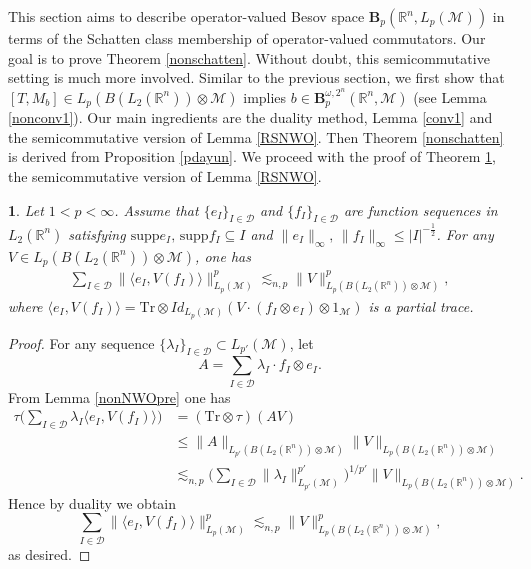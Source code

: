 \documentclass[oneside,english,a4wide]{amsart}
\numberwithin{equation}{section}
\numberwithin{figure}{section}
\theoremstyle{plain}
\newtheorem{thm}{\protect\theoremname}[section]
\theoremstyle{plain}
\theoremstyle{definition}
\theoremstyle{plain}
\theoremstyle{remark}
\theoremstyle{definition}
\theoremstyle{remark}
\theoremstyle{definition}
\providecommand{\theoremname}{Theorem}
\newcommand{\M}{{\mathcal M}}
\newcommand{\8}{\infty}
\begin{document}
This section aims to describe operator-valued Besov space  $\pmb{B}_p(\mathbb{R}^n, L_p(\mathcal{M}))$ in terms of the Schatten class membership of operator-valued commutators. Our goal is to prove Theorem \ref{nonschatten}. Without doubt, this semicommutative setting is much more involved. Similar to the previous section, we first show that $[T,M_b]\in L_p(B(L_2(\mathbb{R}^n))\otimes \mathcal{M})$ implies $b\in \pmb{B}_p^{\omega,2^n}(\mathbb{R}^n,\mathcal{M})$ (see Lemma \ref{nonconv1}). Our main ingredients are the duality method, Lemma \ref{conv1} and the semicommutative version of Lemma \ref{RSNWO}. Then Theorem \ref{nonschatten} is derived from Proposition \ref{pdayun}. We proceed with the proof of Theorem \ref{nonRSNWO}, the semicommutative version of Lemma \ref{RSNWO}.
\begin{thm}\label{nonRSNWO}
	Let $1<p<\infty$. Assume that $\{e_I\}_{I\in\mathcal{D}}$ and $\{f_I\}_{I\in\mathcal{D}}$ are function sequences in $L_2(\mathbb{R}^n)$ satisfying $\mathrm{supp}e_I, \,\mathrm{supp}f_I\subseteq I$ and
	$\|e_I\|_{\infty},\,\|f_I\|_{\infty}\le |I|^{-\frac{1}{2}}$.  For any $V\in L_p(B(L_2(\mathbb{R}^n))\otimes \mathcal{M})$, one has
	\begin{equation*}
		\begin{aligned}
			\sum_{I\in\mathcal{D}}\big\|\langle e_I,V(f_I)\rangle\big\|^p_{L_p(\mathcal{M})}\lesssim_{n,p} \|V\|^p_{L_p(B(L_2(\mathbb{R}^n))\otimes \mathcal{M})},
		\end{aligned}
	\end{equation*}
	where $\langle e_I,V(f_I)\rangle= \mathrm{Tr}\otimes Id_{L_p(\M)}  (V\cdot (f_I\otimes e_I) \otimes 1_\M)$ is a partial trace.
\end{thm}
\begin{proof}
	For any sequence $\{\lambda_I\}_{I\in\mathcal{D}}\subset L_{p'}(\mathcal{M})$, let
	$$A=\sum_{I\in \mathcal{D}}\lambda_I\cdot f_I\otimes e_I. $$
	From Lemma \ref{nonNWOpre} one has
	\begin{equation*}
		\begin{aligned}
			\tau\bigg(\sum_{I\in \mathcal{D}}\lambda_I\langle e_I,V(f_I)\rangle\bigg){}&=(\mathrm{Tr}\otimes \tau)(AV)\\
			&\le \|A\|_{L_{p'}(B(L_2(\mathbb{R}^n))\otimes \mathcal{M})}\|V\|_{L_p(B(L_2(\mathbb{R}^n))\otimes \mathcal{M})}\\
			&\lesssim_{n, p} \biggl(\sum_{I\in\mathcal{D}}\|\lambda_I\|^{p'}_{L_{p'}(\mathcal{M})}\biggr)^{1/p'}\|V\|_{L_p(B(L_2(\mathbb{R}^n))\otimes \mathcal{M})}.
		\end{aligned}
	\end{equation*}
	Hence by duality we obtain
	\begin{equation*}
		\sum_{I\in\mathcal{D}}\big\|\langle e_I,V(f_I)\rangle\big\|^p_{L_p(\mathcal{M})}\lesssim_{n,p} \|V\|^p_{L_p(B(L_2(\mathbb{R}^n))\otimes \mathcal{M})},
	\end{equation*}
	as desired.
\end{proof}
\end{document}
